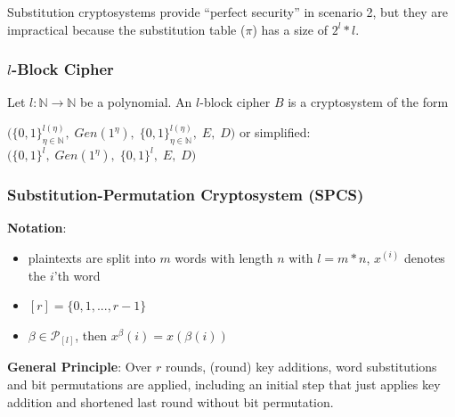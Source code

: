 Substitution cryptosystems provide ``perfect security'' in scenario 2,
but they are impractical because the substitution table (\(\pi\)) has a
size of \(2^l * l\).

\hypertarget{l-block-cipher}{%
\subsubsection{\texorpdfstring{\(l\)-Block
Cipher}{l-Block Cipher}}\label{l-block-cipher}}

Let \(l : \mathbb{N} \rightarrow \mathbb{N}\) be a polynomial. An
\(l\)-block cipher \(B\) is a cryptosystem of the form

\(\bigg(\{0,1\}^{l(\eta)}_{\eta \in \mathbb{N}},\; Gen(1^\eta),\; \{0,1\}^{l(\eta)}_{\eta \in \mathbb{N}},\; E,\; D \bigg)\)
or simplified:
\(\bigg(\{0,1\}^l,\; Gen(1^\eta),\; \{0,1\}^l,\; E,\; D \bigg)\)

\hypertarget{substitution-permutation-cryptosystem-spcs}{%
\subsubsection{Substitution-Permutation Cryptosystem
(SPCS)}\label{substitution-permutation-cryptosystem-spcs}}

\textbf{Notation}:

\begin{itemize}
\tightlist
\item
  plaintexts are split into \(m\) words with length \(n\) with
  \(l = m*n\), \(x^{(i)}\) denotes the \(i\)'th word
\item
  \([r] = \{0, 1, ..., r-1\}\)
\item
  \(\beta \in \mathcal{P}_{[l]}\), then \(x^\beta(i) = x(\beta(i))\)
\end{itemize}

\textbf{General Principle}: Over \(r\) rounds, (round) key additions,
word substitutions and bit permutations are applied, including an
initial step that just applies key addition and shortened last round
without bit permutation.

